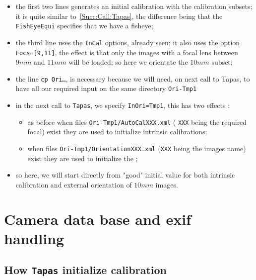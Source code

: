 \begin{itemize}
   \item  the first two lines generates an initial calibration  with the calibration subsets;
	  it is quite similar to~\ref{Succ:Call:Tapas}, the difference being that the
	  {\tt FishEyeEqui} specifies that we have a fisheye;

   \item  the third line uses the  {\tt InCal} options, already seen;  it also
	  uses the option {\tt Focs=[9,11]}, the effect is   that only the images
	  with a focal lens between $9mm$ and $11mm$ will be loaded; so here we orientate
	  the $10mm$ subset;

   \item the line {\tt cp Ori\dots}, is necessary because we will need, on next call to Tapas,
	 to have all our required input on the same directory {\tt Ori-Tmp1}

    \item in the next call to {\tt Tapas}, we specify {\tt InOri=Tmp1},  this has two effects :

\begin{itemize}
	 \item  as before when files {\tt Ori-Tmp1/AutoCalXXX.xml} ( {\tt XXX} being the required focal) exist
		they are used to initialize intrinsic calibrations;

	 \item  when files  {\tt Ori-Tmp1/OrientationXXX.xml} ({\tt XXX} being the images
		name) exist they are used to initialize the ;%
\end{itemize}
    \item  so here, we will start directly from "good" initial value for both intrinsic calibration
	   and external orientation of $10mm$ images.

\end{itemize}



\section{Camera data base and exif handling}

\subsection{How {\tt Tapas} initialize calibration}

